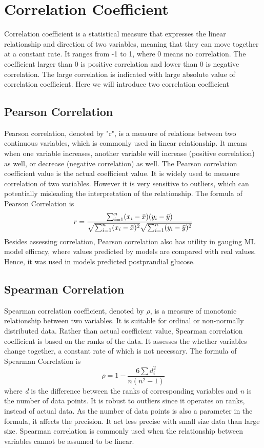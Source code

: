 \documentclass[12pt,a4paper,english
]{tunithesis}
\begin{document}
\section{Correlation Coefficient}
Correlation coefficient is a statistical measure that expresses the linear relationship and direction of two variables, meaning that they can move together at a constant rate. It ranges from -1 to 1, where 0 means no correlation. The coefficient larger than 0 is positive correlation and lower than 0 is negative correlation. The large correlation is indicated with large absolute value of correlation coefficient. Here we will introduce two correlation coefficient

\subsection{Pearson Correlation}
Pearson correlation, denoted by "r", is a measure of relations between two continuous variables, which is commonly used in linear relationship. It means when one variable increases, another variable will increase (positive correlation) as well, or decrease (negative correlation) as well. The Pearson correlation coefficient value is the actual coefficient value. It is widely used to measure correlation of two variables. However it is very sensitive to outliers, which can potentially misleading the interpretation of the relationship. The formula of Pearson Correlation is
\begin{equation*}
  r =
  \frac{ \sum_{i=1}^{n}(x_i-\bar{x})(y_i-\bar{y}) }{%
        \sqrt{\sum_{i=1}^{n}(x_i-\bar{x})^2}\sqrt{\sum_{i=1}^{n}(y_i-\bar{y})^2}}
\end{equation*}
Besides assessing correlation, Pearson correlation also has utility in gauging ML model efficacy, where values predicted by models are compared with real values. Hence, it was used in models predicted postprandial glucose. \parencite{kirk2021} 

\subsection{Spearman Correlation}
Spearman correlation coefficient, denoted by \(\rho\), is a measure of monotonic relationship between two variables. It is suitable for ordinal or non-normally distributed data. Rather than actual coefficient value, Spearman correlation coefficient is based on the ranks of the data. It assesses the whether variables change together, a constant rate of which is not necessary. The formula of Spearman Correlation is
\begin{equation*}
    \rho = 1- {\frac {6 \sum d_i^2}{n(n^2 - 1)}}
\end{equation*}
where \textit{d} is the difference between the ranks of corresponding variables and \textit{n} is the number of data points. It is robust to outliers since it operates on ranks, instead of actual data. As the number of data points is also a parameter in the formula, it affects the precision. It act less precise with small size data than large size. Spearman correlation is commonly used when  the relationship between variables cannot be assumed to be linear.
\end{document}
